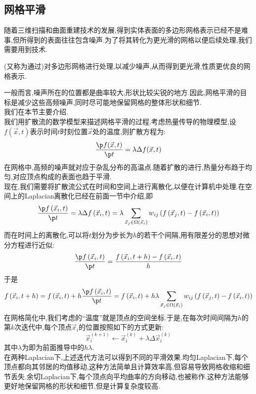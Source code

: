 \documentclass{ctexart}
\begin{document}
\subsection{网格平滑}
随着三维扫描和曲面重建技术的发展,得到实体表面的多边形网格表示已经不是难事,但所得到的表面往往包含噪声.为了将其转化为更光滑的网格以便后续处理,我们需要用到技术.
\begin{definition}[网格平滑]
    (又称为通过)对多边形网格进行处理,以减少噪声,从而得到更光滑,性质更优良的网格表示.
\end{definition}
一般而言,噪声所在的位置都是曲率较大,形状比较尖锐的地方.因此,网格平滑的目标是减少这些高频噪声,同时尽可能地保留网格的整体形状和细节.\\
\indent 我们在本节主要介绍.\\
\indent 我们用扩散流的数学模型来描述网格平滑的过程.考虑热量传导的物理模型,设$f(\vec{x},t)$表示时间$t$时刻位置$\vec{x}$处的温度,则扩散方程为:
\[\dfrac{\p f(\vec{x},t)}{\p t}=\lambda\Delta f(\vec{x},t)\]
在网格中,高频的噪声就对应于杂乱分布的高温点.随着扩散的进行,热量分布趋于均匀,对应顶点构成的表面也趋于平滑.\\
\indent 现在,我们需要将扩散流公式在时间和空间上进行离散化,以便在计算机中处理.在空间上的Laplacian离散化已经在前面一节中介绍,即
\[\dfrac{\p f\left(\vec{x}_i,t\right)}{\p t}=\lambda\Delta f\left(\vec{x}_i,t\right)=\lambda\sum_{\vec{x}_j\in\Omega\left(\vec{x}_i\right)}w_{ij}\left(f\left(\vec{x}_j,t\right)-f\left(\vec{x}_i,t\right)\right)\]
而在时间上的离散化,可以将$t$划分为步长为$h$的若干个间隔,用有限差分的思想对微分方程进行近似:
\[\dfrac{\p f\left(\vec{x}_i,t\right)}{\p t}=\dfrac{f\left(\vec{x}_i,t+h\right)-f\left(\vec{x}_i,t\right)}{h}\]
于是
\[f\left(\vec{x}_i,t+h\right)=f\left(\vec{x}_i,t\right)+h\dfrac{\p f\left(\vec{x}_i,t\right)}{\p t}=f\left(\vec{x}_i,t\right)+h\lambda\sum_{\vec{x}_j\in\Omega\left(\vec{x}_i\right)}w_{ij}\left(f\left(\vec{x}_j,t\right)-f\left(\vec{x}_i,t\right)\right)\]
\indent 在网格简化中,我们考虑的``温度''就是顶点的空间坐标.于是,在每次时间间隔为$h$的第$k$次迭代中,每个顶点$\vec{x}_i$的位置按照如下的方式更新:
\[\vec{x}_i^{(k+1)}\leftarrow\vec{x}_i^{(k)}+\lambda\Delta\vec{x}_i^{(k)}\]
其中$\lambda$为即为前面推导中的$h\lambda$.\\
\indent 在两种Laplacian下,上述迭代方法可以得到不同的平滑效果.均匀Laplacian下,每个顶点都向其邻居的均值移动,这种方法简单且计算效率高,但容易导致网格收缩和细节丢失.余切Laplacian下,每个顶点向平均曲率的方向移动,也被称作.这种方法能够更好地保留网格的形状和细节,但是计算复杂度较高.
\end{document}
